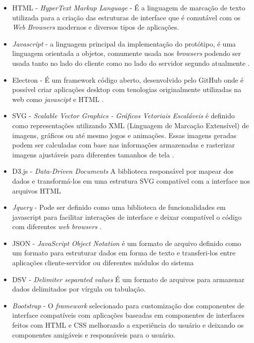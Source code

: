 \documentclass[
	12pt,				%
	openright,			%
	oneside,			%
	a4paper,			%
	english,			%
	brazil				%
	]{abntex2}
\begin{document}
\begin{itemize}
    \item HTML - \textit{HyperText Markup Language} - É a linguagem de marcação de texto utilizada para a criação das estruturas de interface que é comutável com os \textit{Web Browsers} modernos e diversos tipos de aplicações.
    
    \item  \textit{Javascript} - a linguagem principal da implementação do protótipo, é uma linguagem orientada a objetos, comumente usada nos \textit{browsers} podendo ser usada tanto no lado do cliente como no lado do servidor segundo atualmente \cite{javacript}.
    
    \item Electron - É um framework código aberto, desenvolvido pelo GitHub onde é possível criar aplicações desktop com tenologias originalmente utilizadas na web como \textit{javascipt} e HTML \cite{electron}.
    
    \item SVG - \textit{Scalable Vector Graphics - Gráficos Vetoriais Escaláveis} é definido como representações utilizando XML (Linguagem de Marcação Extensível) de imagens, gráficos ou até mesmo jogos e animações. Essas imagens geradas podem ser calculadas com base nas informações armazenadas e rasterizar imagens ajustáveis para diferentes tamanhos de tela \cite{peng2000scalable}.
    
    \item D3.js - \textit{Data-Driven Documents} A biblioteca responsável por mapear dos dados e transformá-los em uma estrutura SVG compatível com a interface nos arquivos HTML \cite{bostock2011d3}
    
    \item  \textit{Jquery}  - Pode ser definido como uma biblioteca de funcionalidades em javascript para facilitar interações de interface e deixar compatível o código com diferentes \textit{web browsers} \cite{jquery}.

    \item JSON - \textit{JavaScript Object Notation} é um formato de arquivo definido como um formato para estruturar dados em forma de texto e transferi-los entre aplicações cliente-servidor ou diferentes módulos do sistema \cite{json}
    
    \item DSV -  \textit{Delimiter separated values} É um formato de arquivos para armazenar dados delimitados por vírgula ou tabulação.
    
    \item \textit{Bootstrap} -  O \textit{framework} \cite{bootsrap} selecionado para customização dos componentes de interface compatíveis com aplicações baseadas em componentes de interfaces feitos com HTML e CSS melhorando a experiência do usuário e deixando os componentes amigáveis e responsáveis para o usuário. 
\end{itemize}
\end{document}
